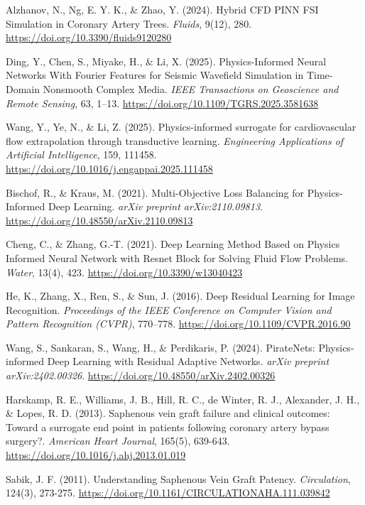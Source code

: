 ﻿\documentclass[12pt,a4paper]{article}
\theoremstyle{definition}
\numberwithin{equation}{section}
\begin{document}
\begin{thebibliography}{}
{ Alzhanov, N., Ng, E. Y. K., \& Zhao, Y. (2024). Hybrid CFD PINN FSI Simulation in Coronary Artery Trees. \textit{Fluids}, 9(12), 280. \url{https://doi.org/10.3390/fluids9120280}}

{ Ding, Y., Chen, S., Miyake, H., \& Li, X. (2025). Physics-Informed Neural Networks With Fourier Features for Seismic Wavefield Simulation in Time-Domain Nonsmooth Complex Media. \textit{IEEE Transactions on Geoscience and Remote Sensing}, 63, 1--13. \url{https://doi.org/10.1109/TGRS.2025.3581638}}

{ Wang, Y., Ye, N., \& Li, Z. (2025). Physics-informed surrogate for cardiovascular flow extrapolation through transductive learning. \textit{Engineering Applications of Artificial Intelligence}, 159, 111458. \url{https://doi.org/10.1016/j.engappai.2025.111458}}

{ Bischof, R., \& Kraus, M. (2021). Multi-Objective Loss Balancing for Physics-Informed Deep Learning. \textit{arXiv preprint arXiv:2110.09813}. \url{https://doi.org/10.48550/arXiv.2110.09813}}

{ Cheng, C., \& Zhang, G.-T. (2021). Deep Learning Method Based on Physics Informed Neural Network with Resnet Block for Solving Fluid Flow Problems. \textit{Water}, 13(4), 423. \url{https://doi.org/10.3390/w13040423}}

{ He, K., Zhang, X., Ren, S., \& Sun, J. (2016). Deep Residual Learning for Image Recognition. \textit{Proceedings of the IEEE Conference on Computer Vision and Pattern Recognition (CVPR)}, 770--778. \url{https://doi.org/10.1109/CVPR.2016.90}}

{ Wang, S., Sankaran, S., Wang, H., \& Perdikaris, P. (2024). PirateNets: Physics-informed Deep Learning with Residual Adaptive Networks. \textit{arXiv preprint arXiv:2402.00326}. \url{https://doi.org/10.48550/arXiv.2402.00326}}

{ Harskamp, R. E., Williams, J. B., Hill, R. C., de Winter, R. J., Alexander, J. H., \& Lopes, R. D. (2013). Saphenous vein graft failure and clinical outcomes: Toward a surrogate end point in patients following coronary artery bypass surgery?. \textit{American Heart Journal}, 165(5), 639-643. \url{https://doi.org/10.1016/j.ahj.2013.01.019}}

{ Sabik, J. F. (2011). Understanding Saphenous Vein Graft Patency. \textit{Circulation}, 124(3), 273-275. \url{https://doi.org/10.1161/CIRCULATIONAHA.111.039842}}


\end{thebibliography}
\end{document}
